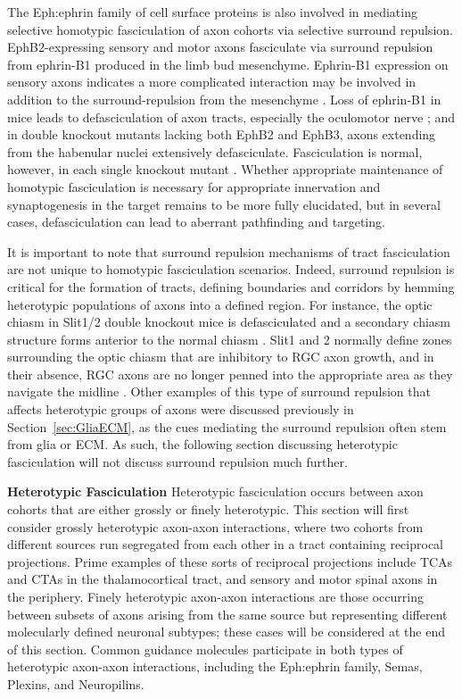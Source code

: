The Eph:ephrin family of cell surface proteins is also involved in mediating selective homotypic fasciculation of axon cohorts via selective surround repulsion.
EphB2-expressing sensory and motor axons fasciculate via surround repulsion from ephrin-B1 produced in the limb bud mesenchyme.
Ephrin-B1 expression on sensory axons indicates a more complicated interaction may be involved in addition to the surround-repulsion from the mesenchyme \cite{luxey2013eph}.
Loss of ephrin-B1 in mice leads to defasciculation of axon tracts, especially the oculomotor nerve \cite{davy2004ephrin}; and in double knockout mutants lacking both EphB2 and EphB3, axons extending from the habenular nuclei extensively defasciculate.
Fasciculation is normal, however, in each single knockout mutant \cite{orioli1996sek4}.
Whether appropriate maintenance of homotypic fasciculation is necessary for appropriate innervation and synaptogenesis in the target remains to be more fully elucidated, but in several cases, defasciculation can lead to aberrant pathfinding and targeting.

It is important to note that surround repulsion mechanisms of tract fasciculation are not unique to homotypic fasciculation scenarios.
Indeed, surround repulsion is critical for the formation of tracts, defining boundaries and corridors by hemming heterotypic populations of axons into a defined region.
For instance, the optic chiasm in Slit1/2 double knockout mice is defasciculated and a secondary chiasm structure forms anterior to the normal chiasm \cite{plump2002slit1}.
Slit1 and 2 normally define zones surrounding the optic chiasm that are inhibitory to RGC axon growth, and in their absence, RGC axons are no longer penned into the appropriate area as they navigate the midline \cite{plump2002slit1}.
Other examples of this type of surround repulsion that affects heterotypic groups of axons were discussed previously in Section~\ref{sec:GliaECM}, as the cues mediating the surround repulsion often stem from glia or ECM.
As such, the following section discussing heterotypic fasciculation will not discuss surround repulsion much further.

\textbf{Heterotypic Fasciculation}
\label{sec:HeterotypicFascic}
Heterotypic fasciculation occurs between axon cohorts that are either grossly or finely heterotypic.
This section will first consider grossly heterotypic axon-axon interactions, where two cohorts from different sources run segregated from each other in a tract containing reciprocal projections.
Prime examples of these sorts of reciprocal projections include TCAs and CTAs in the thalamocortical tract, and sensory and motor spinal axons in the periphery.
Finely heterotypic axon-axon interactions are those occurring between subsets of axons arising from the same source but representing different molecularly defined neuronal subtypes; these cases will be considered at the end of this section.
Common guidance molecules participate in both types of heterotypic axon-axon interactions, including the Eph:ephrin family, Semas, Plexins, and Neuropilins.

